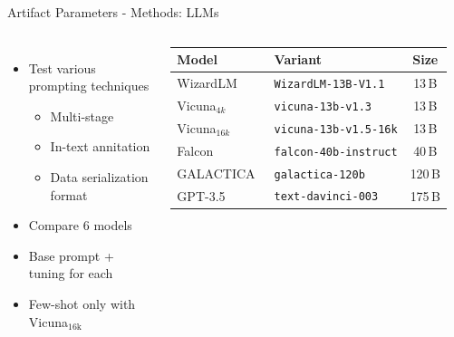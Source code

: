 \documentclass[en,16:9,smallfoot]{sdqbeamer}
\begin{document}
   \begin{frame}{Artifact Parameters - Methods: LLMs}
   \begin{columns}
           \begin{itemize}
               \item Test various prompting techniques
               \begin{itemize}
                   \item Multi-stage
                   \item In-text annitation
                   \item Data serialization format \checkmark
               \end{itemize}
               \item Compare 6 models
               \item Base prompt + tuning for each
               \item Few-shot only with Vicuna${}_\text{16k}$
           \end{itemize}
        \begin{table}
        \centering
          \begin{tabular}{llc}
            \hline
            Model & Variant & Size \\
            \hline
            WizardLM~\cite{xu2023wizardlm2023}
            & \texttt{WizardLM-13B-V1.1} & 13\,B \\
            Vicuna${}_{4k}$~\cite{vicuna2023}
            & \texttt{vicuna-13b-v1.3} & 13\,B \\
            Vicuna${}_{16k}$~\cite{vicuna2023}
            & \texttt{vicuna-13b-v1.5-16k} & 13\,B \\
            Falcon~\cite{falcon40b-huggingface}
            & \texttt{falcon-40b-instruct} & 40\,B \\
            GALACTICA~\cite{GALACTICA2022}
            & \texttt{galactica-120b} & 120\,B \\
            GPT-3.5~\cite{Brown2020gpt3}
            & \texttt{text-davinci-003} & 175\,B \\
            \hline
            \end{tabular}
        \end{table}
   \end{columns}
   \end{frame}
\end{document}

